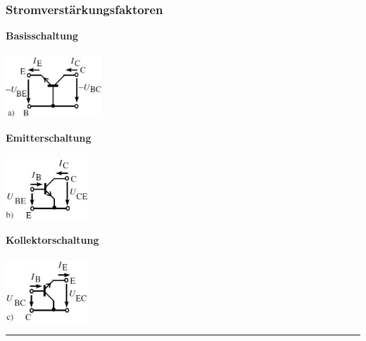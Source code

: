   \subsubsection{Stromverst\"arkungsfaktoren}
    \begin{minipage}[T]{6cm}
      \bf Basisschaltung\\
      \\
      \includegraphics[height=2.3cm]{./bilder/AmpBasisSch.png}
    \end{minipage}
    \begin{minipage}[T]{6cm}
      \bf Emitterschaltung\\
      \\
      \includegraphics[height=2.3cm]{./bilder/AmpEmitSch.png}                
    \end{minipage}
    \begin{minipage}[T]{6cm}
      \bf Kollektorschaltung\\
      \\
      \includegraphics[height=2.3cm]{./bilder/AmpKolSch.png}                
    \end{minipage}
    
\hrule

